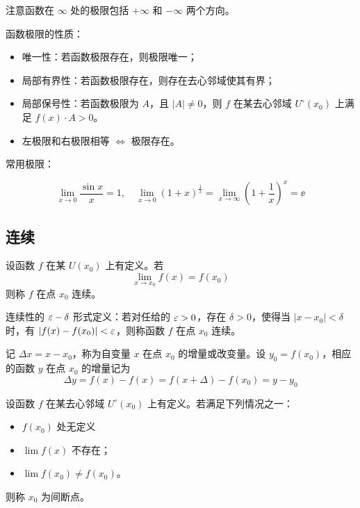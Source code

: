 \begin{note}
	注意函数在 $\infty$ 处的极限包括 $+\infty$ 和 $-\infty$ 两个方向。
\end{note}

函数极限的性质：

\begin{itemize}
	\item 唯一性：若函数极限存在，则极限唯一；
	\item 局部有界性：若函数极限存在，则存在去心邻域使其有界；
	\item 局部保号性：若函数极限为 $A$，且 $|A| \neq 0$，则 $f$ 在某去心邻域 $U^\circ(x_0)$ 上满足 $f(x) \cdot A > 0$。
	\item 左极限和右极限相等 $\Longleftrightarrow$ 极限存在。
\end{itemize}

常用极限：

\[ \lim_{x \to 0} \frac{\sin x}{x} = 1, \quad \lim_{x \to 0} (1+x)^{\frac{1}{x}} = \lim_{x \to \infty} \left(1 + \frac{1}{x}\right)^x = \ee \]


\subsection{连续}

\begin{definition}[连续性]
	设函数 $f$ 在某 $U(x_0)$ 上有定义。若
	\[ \lim_{x\to x_0}f(x) = f(x_0) \]
	则称 $f$ 在点 $x_0$ 连续。

	连续性的 $\varepsilon-\delta$ 形式定义：若对任给的 $\varepsilon>0$，存在 $\delta>0$，使得当 $|x-x_0|<\delta$ 时，有 $|f(x)-f(x_0)|<\varepsilon$，则称函数 $f$ 在点 $x_0$ 连续。
\end{definition}

记 $\Delta x = x-x_0$，称为自变量 $x$ 在点 $x_0$ 的增量或改变量。设 $y_0=f(x_0)$，相应的函数 $y$ 在点 $x_0$ 的增量记为
\[ \Delta y = f(x)-f(x) = f(x+\Delta)-f(x_0) = y-y_0 \]



\begin{definition}[间断点]
	设函数 $f$ 在某去心邻域 $U^\circ(x_0)$ 上有定义。若满足下列情况之一：
	\begin{itemize}
		\item $f(x_0)$ 处无定义
		\item $\lim f(x)$ 不存在；
		\item $\lim f(x_0) \neq f(x_0)$。
	\end{itemize}
	则称 $x_0$ 为间断点。
\end{definition}

